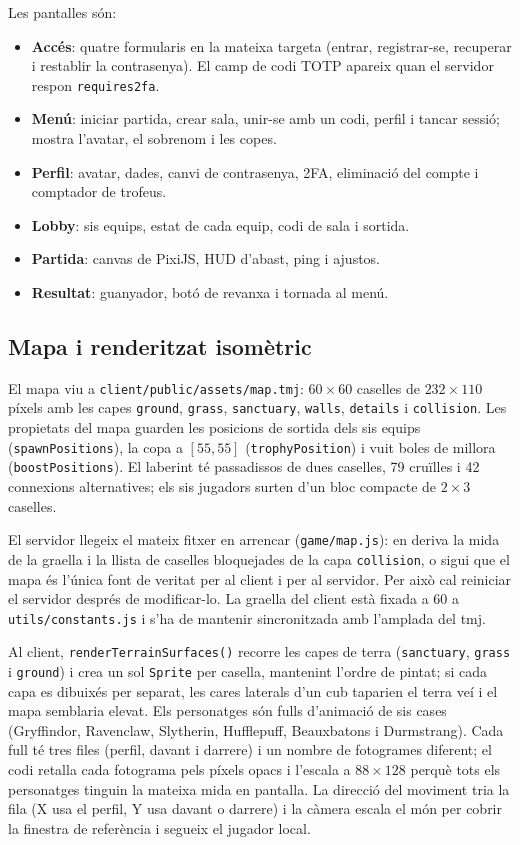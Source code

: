 \documentclass[11pt,a4paper]{article}
\begin{document}
Les pantalles són:

\begin{itemize}[nosep]
  \item \textbf{Accés}: quatre formularis en la mateixa targeta (entrar, registrar-se,
        recuperar i restablir la contrasenya). El camp de codi TOTP apareix quan el
        servidor respon \texttt{requires2fa}.
  \item \textbf{Menú}: iniciar partida, crear sala, unir-se amb un codi, perfil i
        tancar sessió; mostra l'avatar, el sobrenom i les copes.
  \item \textbf{Perfil}: avatar, dades, canvi de contrasenya, 2FA, eliminació del
        compte i comptador de trofeus.
  \item \textbf{Lobby}: sis equips, estat de cada equip, codi de sala i sortida.
  \item \textbf{Partida}: canvas de PixiJS, HUD d'abast, ping i ajustos.
  \item \textbf{Resultat}: guanyador, botó de revanxa i tornada al menú.
\end{itemize}

\subsection{Mapa i renderitzat isomètric}

El mapa viu a \texttt{client/public/assets/map.tmj}: $60 \times 60$ caselles de
$232 \times 110$ píxels amb les capes \texttt{ground}, \texttt{grass},
\texttt{sanctuary}, \texttt{walls}, \texttt{details} i \texttt{collision}. Les
propietats del mapa guarden les posicions de sortida dels sis equips
(\texttt{spawnPositions}), la copa a $[55,55]$ (\texttt{trophyPosition}) i vuit boles
de millora (\texttt{boostPositions}). El laberint té passadissos de dues caselles, 79
cruïlles i 42 connexions alternatives; els sis jugadors surten d'un bloc compacte de
$2 \times 3$ caselles.

El servidor llegeix el mateix fitxer en arrencar (\texttt{game/map.js}): en deriva la
mida de la graella i la llista de caselles bloquejades de la capa \texttt{collision},
o sigui que el mapa és l'única font de veritat per al client i per al servidor. Per
això cal reiniciar el servidor després de modificar-lo. La graella del client està
fixada a 60 a \texttt{utils/constants.js} i s'ha de mantenir sincronitzada amb
l'amplada del tmj.

Al client, \texttt{renderTerrainSurfaces()} recorre les capes de terra
(\texttt{sanctuary}, \texttt{grass} i \texttt{ground}) i crea un sol \texttt{Sprite}
per casella, mantenint l'ordre de pintat; si cada capa es dibuixés per separat, les
cares laterals d'un cub taparien el terra veí i el mapa semblaria elevat. Els
personatges són fulls d'animació de sis cases (Gryffindor, Ravenclaw, Slytherin,
Hufflepuff, Beauxbatons i Durmstrang). Cada full té tres files (perfil, davant i
darrere) i un nombre de fotogrames diferent; el codi retalla cada fotograma pels píxels
opacs i l'escala a $88 \times 128$ perquè tots els personatges tinguin la mateixa mida
en pantalla. La direcció del moviment tria la fila (X usa el perfil, Y usa davant o
darrere) i la càmera escala el món per cobrir la finestra de referència i segueix el
jugador local.
\end{document}
